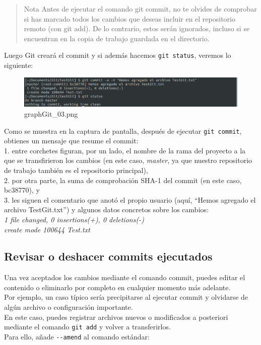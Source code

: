 \documentclass[11pt]{article}
\begin{document}
\begin{quote}
Nota Antes de ejecutar el comando git commit, no te olvides de comprobar
si has marcado todos los cambios que deseas incluir en el repositorio
remoto (con git add). De lo contrario, estos serán ignorados, incluso si
se encuentran en la copia de trabajo guardada en el directorio.
\end{quote}

Luego Git creará el commit y si además hacemos \texttt{git\ status},
veremos lo siguiente:

    \begin{figure}
\centering
\includegraphics{graphGit_03.png}
\caption{graphGit\_03.png}
\end{figure}

    Como se muestra en la captura de pantalla, después de ejecutar
\texttt{git\ commit}, obtienes un mensaje que resume el commit:\\
1. entre corchetes figuran, por un lado, el nombre de la rama del
proyecto a la que se transfirieron los cambios (en este caso,
\emph{master}, ya que nuestro repositorio de trabajo también es el
repositorio principal),\\
2. por otra parte, la suma de comprobación SHA-1 del commit (en este
caso, bc38770), y\\
3. les siguen el comentario que anotó el propio usuario (aquí, ``Hemos
agregado el archivo TestGit.txt'') y algunos datos concretos sobre los
cambios:\\
\emph{1 file changed, 0 insertions(+), 0 deletions(-)}\\
\emph{create mode 100644 Test.txt}

    \hypertarget{revisar-o-deshacer-commits-ejecutados}{%
\subsection{Revisar o deshacer commits
ejecutados}\label{revisar-o-deshacer-commits-ejecutados}}

Una vez aceptados los cambios mediante el comando commit, puedes editar
el contenido o eliminarlo por completo en cualquier momento más
adelante.\\
Por ejemplo, un caso típico sería precipitarse al ejecutar commit y
olvidarse de algún archivo o configuración importante.\\
En este caso, puedes registrar archivos nuevos o modificados a
posteriori mediante el comando \texttt{git\ add} y volver a
transferirlos.\\
Para ello, añade \texttt{-\/-amend} al comando estándar:
\end{document}
